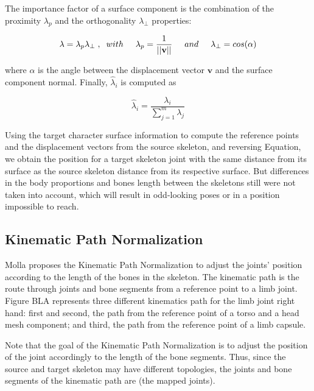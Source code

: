 \documentclass{vgtc}
\begin{document}
The importance factor of a surface component is the combination of the
proximity \(\lambda_p\) and the orthogonality \(\lambda_{\perp}\)
properties:

\begin{equation}
\label{eq:importance}
\lambda = \lambda_p \lambda_{\perp}\hspace{0.1cm},\hspace{0.2cm} with \hspace{0.5cm}\lambda_p =  \frac{1}{||\mathbf{v}||}\hspace{0.5cm} and \hspace{0.5cm}\lambda_{\perp} = cos(\alpha)
\end{equation}

where \(\alpha\) is the angle between the displacement vector
\(\mathbf{v}\) and the surface component normal. Finally,
\(\hat{\lambda}_{i}\) is computed as

\begin{equation}
\label{eq:importance_ortho}
\hat{\lambda}_{i} = \frac{\lambda_{i}}{\sum_{j=1}^{m}\lambda_{j}}
\end{equation}

Using the target character surface information to compute the reference
points and the displacement vectors from the source skeleton, and
reversing Equation, we obtain the position for a target skeleton joint
with the same distance from its surface as the source skeleton distance
from its respective surface. But differences in the body proportions and
bones length between the skeletons still were not taken into account,
which will result in odd-looking poses or in a position impossible to
reach.


    \hypertarget{kinematic-path-normalization}{%
\subsection{Kinematic Path
Normalization}\label{kinematic-path-normalization}}

Molla proposes the Kinematic Path Normalization to adjust the joints'
position according to the length of the bones in the skeleton. The
kinematic path is the route through joints and bone segments from a
reference point to a limb joint. Figure BLA represents three different
kinematics path for the limb joint right hand: first and second, the
path from the reference point of a torso and a head mesh component; and
third, the path from the reference point of a limb capsule.

Note that the goal of the Kinematic Path Normalization is to adjust the
position of the joint accordingly to the length of the bone segments.
Thus, since the source and target skeleton may have different
topologies, the joints and bone segments of the kinematic path are (the
mapped joints).
\end{document}
